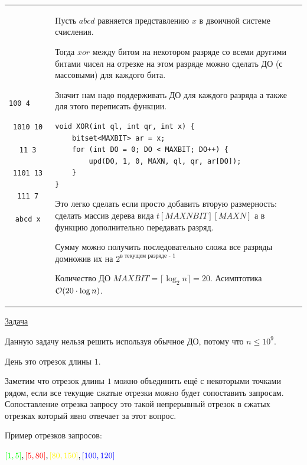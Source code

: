 \down
\begin{tabular}{cm{15cm}}
	\begin{minipage}{2.5cm}
		\begin{verbatim}
			100 4    
			1010 10
			11 3
			1101 13
			111 7
			abcd x
		\end{verbatim}
	\end{minipage} 
	&
	Пусть $abcd$ равняется представлению $x$ в двоичной  системе счисления.
	
	Тогда $xor$ между битом на некотором разряде со всеми другими битами чисел на отрезке на этом разряде можно сделать ДО (с массовыми) для каждого бита.
	
	Значит нам надо поддерживать ДО для каждого разряда а также для этого переписать функции.
	
	\up \up
	\begin{verbatim}
void XOR(int ql, int qr, int x) {
	bitset<MAXBIT> ar = x;
	for (int DO = 0; DO < MAXBIT; DO++) {
		upd(DO, 1, 0, MAXN, ql, qr, ar[DO]);
	}
}
	\end{verbatim}
	\up \up
	
	
	Это легко сделать если просто добавить вторую размерность: сделать массив дерева вида $t[MAXNBIT][MAXN]$ а в функцию 
	дополнительно передавать разряд.
	
	Сумму можно получить последовательно сложа все разряды домножив их на $2^{\text{в текущем разряде - 1}}$
	
	Количество ДО $MAXBIT=\lceil\log_2 n\rceil = 20$. Асимптотика $\mathcal{O}(20 \cdot \log n)$.
\end{tabular}

\pagebreak


\href{https://codeforces.com/contest/915/problem/E}{Задача}
\href{https://codeforces.com/contest/915/submission/106223693}{}

Данную задачу нельзя решить используя обычное ДО, потому что $n \le 10^9$.

День это отрезок длины $1$.

Заметим что отрезок длины $1$ можно объединить ещё с некоторыми точками рядом, если все текущие сжатые отрезки можно будет сопоставить запросам. Сопоставление отрезка запросу это такой непрерывный отрезок в сжатых отрезках который явно отвечает за этот вопрос.

Пример отрезков запросов:

$\green{[1, 5]}, \red{[5, 80]}, \yellow{[80, 150]}, \blue{[100, 120]}$

